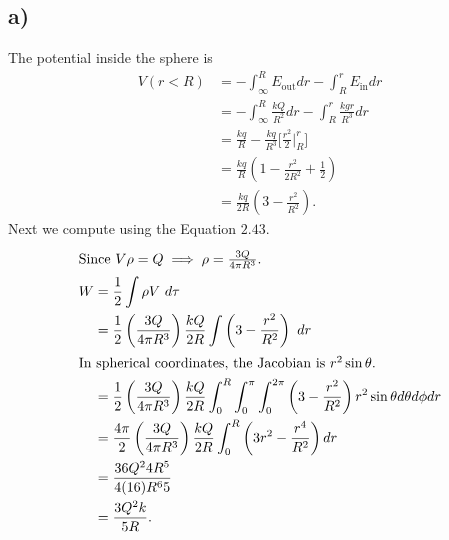 \documentclass[
	12pt,
	]{article}
\theoremstyle{definition}
\theoremstyle{definition}
\theoremstyle{definition}
\theoremstyle{definition}
\theoremstyle{definition}
\theoremstyle{example}
\theoremstyle{note}
\theoremstyle{remark}
\theoremstyle{example}
\begin{document}
			\subsection*{a) }
				The potential inside the sphere is
				\begin{align*}
					V(r<R) &= - \int_{\infty}^{R} E_{\text{out}} dr - \int_{R}^{r} E_{\text{in}}dr \\
					&=-\int_{\infty}^{R} \frac{kQ}{R^{2}} dr - \int_{R}^{r} \frac{kgr}{R^{3}} dr \\
					&= \frac{kq}{R} - \frac{kq}{R^{3}} \Biggl[\frac{r^{2}}{2}\Big|_{R}^{r}\Biggr] \\
					&= \frac{kq}{R}(1-\frac{r^{2}}{2R^{2}} +\frac12) \\
					&= \frac{kq}{2R} \left(3- \frac{r^{2}}{R^{2}}\right).
 				\end{align*}
 				Next we compute using the Equation $2.43$.
 				\begin{align*}
 					\intertext{Since $V\rho = Q \implies \rho =\frac{3Q}{4 \pi R^{3}}$.}
 					W &= \frac12 \int \rho V \ d\tau \\
 					&= \frac12 \left(\frac{3Q}{4\pi R^{3}}\right)\frac{kQ}{2R} \int \left(3 - \frac{r^{2}}{R^{2}}\right) \ dr \\
 					\intertext{In spherical coordinates, the Jacobian is $r^{2}\sin\theta$.}
 					&=\frac12 \left(\frac{3Q}{4\pi R^{3}}\right)\frac{kQ}{2R} \int_{0}^{R}\int_{0}^{\pi} \int_{0}^{2\pi} \left(3 - \frac{r^{2}}{R^{2}}\right) r^{2} \sin \theta d\theta d\phi dr \\
 					&= \frac{4\pi}{2} \left(\frac{3Q}{4\pi R^{3}}\right)\frac{kQ}{2R} \int_{0}^{R} \left(3r^{2} - \frac{r^{4}}{R^{2}}\right) dr \\
 					&= \frac{36Q^{2} 4R^{5}}{4(16)R^{6}5} \\
 					&= \frac{3Q^{2}k}{5R}.
 				\end{align*}
\end{document}

